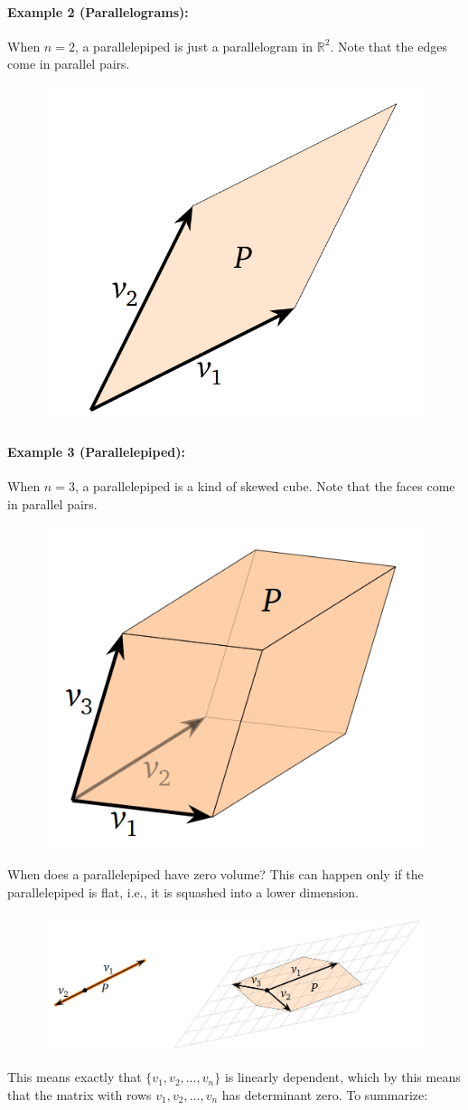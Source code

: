 \documentclass[a4paper,12pt]{article}
\begin{document}
\paragraph{Example 2 (Parallelograms):}When \( n = 2 \), a parallelepiped is just a parallelogram in \( \mathbb{R}^2 \). Note that the edges come in parallel pairs.
\begin{figure}[H]
    \centering
    \includegraphics[width=0.5\linewidth]{example2paralellogram.png}
\end{figure}

\paragraph{Example 3 (Parallelepiped):}When \( n = 3 \), a parallelepiped is a kind of skewed cube. Note that the faces come in parallel pairs.
\begin{figure}[H]
    \centering
    \includegraphics[width=0.5\linewidth]{parallelepiped .png}
\end{figure}
When does a parallelepiped have zero volume? This can happen only if the parallelepiped is flat, i.e., it is squashed into a lower dimension.
\begin{figure}[H]
    \centering
    \includegraphics[width=0.75\linewidth]{flat.png}
\end{figure}
This means exactly that \( \{ v_1, v_2, \dots, v_n \} \) is linearly dependent, which by this means that the matrix with rows \( v_1, v_2, \dots, v_n \) has determinant zero. To summarize:
\end{document}
